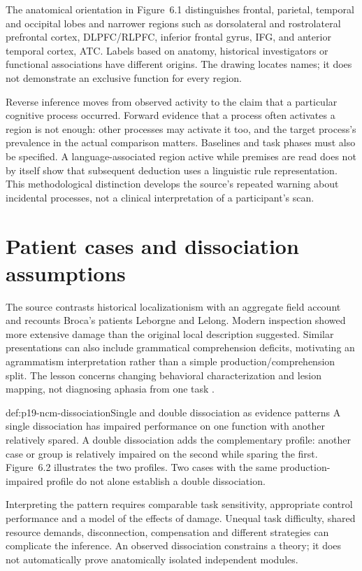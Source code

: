 The anatomical orientation in Figure~6.1 distinguishes frontal,
parietal, temporal and occipital lobes and narrower regions such
as dorsolateral and rostrolateral prefrontal cortex, DLPFC/RLPFC,
inferior frontal gyrus, IFG, and anterior temporal cortex, ATC.
Labels based on anatomy, historical investigators or functional
associations have different origins. The drawing locates names;
it does not demonstrate an exclusive function for every region.

Reverse inference moves from observed activity to the claim that
a particular cognitive process occurred. Forward evidence that
a process often activates a region is not enough: other processes
may activate it too, and the target process's prevalence in the
actual comparison matters. Baselines and task phases must also
be specified. A language-associated region active while premises
are read does not by itself show that subsequent deduction uses
a linguistic rule representation. This methodological distinction
develops the source's repeated warning about incidental processes,
not a clinical interpretation of a participant's scan.

\section{Patient cases and dissociation assumptions}
\label{sec:p19-ncm-patients}

The source contrasts historical localizationism with an aggregate
field account and recounts Broca's patients Leborgne and Lelong.
Modern inspection showed more extensive damage than the original
local description suggested. Similar presentations can also include
grammatical comprehension deficits, motivating an agrammatism
interpretation rather than a simple production/comprehension split.
The lesson concerns changing behavioral characterization and lesion
mapping, not diagnosing aphasia from one task
\cite[pp.~68, 72 and figs.~6.1--6.2]{MorrisonKnowlton2012Methods}.

\begin{hbdefinition}{def:p19-ncm-dissociation}{Single and double dissociation as evidence patterns}
A single dissociation has impaired performance on one function
with another relatively spared. A double dissociation adds the
complementary profile: another case or group is relatively impaired
on the second while sparing the first. Figure~6.2 illustrates
the two profiles. Two cases with the same production-impaired
profile do not alone establish a double dissociation.

Interpreting the pattern requires comparable task sensitivity,
appropriate control performance and a model of the effects of
damage. Unequal task difficulty, shared resource demands, disconnection,
compensation and different strategies can complicate the inference.
An observed dissociation constrains a theory; it does not automatically
prove anatomically isolated independent modules.
\end{hbdefinition}

